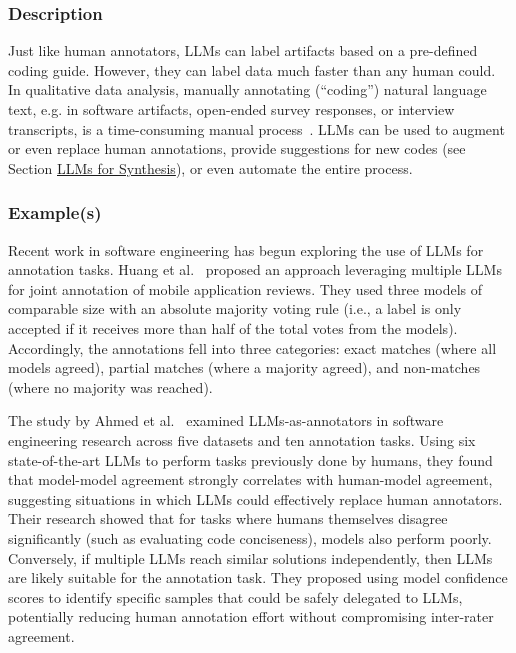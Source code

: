 \subsubsection{Description}

Just like human annotators, LLMs can label artifacts based on a pre-defined coding guide.
However, they can label data much faster than any human could. 
In qualitative data analysis, manually annotating (``coding'') natural language text, e.g. in software artifacts, open-ended survey responses, or interview transcripts, is a time-consuming manual process~\cite{DBLP:journals/ase/BanoHZT24}.
LLMs can be used to augment or even replace human annotations, provide suggestions for new codes (see Section \href{/study-types/#llms-for-synthesis}{LLMs for Synthesis}), or even automate the entire process.

\subsubsection{Example(s)}

Recent work in software engineering has begun exploring the use of LLMs for annotation tasks.
Huang et al.~\cite{Huang2023Enhancing} proposed an approach leveraging multiple LLMs for joint annotation of mobile application reviews. 
They used three models of comparable size with an absolute majority voting rule (i.e., a label is only accepted if it receives more than half of the total votes from the models). %
Accordingly, the annotations fell into three categories: exact matches (where all models agreed), partial matches (where a majority agreed), and non-matches (where no majority was reached).

The study by Ahmed et al.~\cite{Ahmed2025} examined LLMs-as-annotators in software engineering research across five datasets and ten annotation tasks. Using six state-of-the-art LLMs to perform tasks previously done by humans, they found that model-model agreement strongly correlates with human-model agreement, suggesting situations in which LLMs could effectively replace human annotators. Their research showed that for tasks where humans themselves disagree significantly (such as evaluating code conciseness), models also perform poorly. Conversely, if multiple LLMs reach similar solutions independently, then LLMs are likely suitable for the annotation task. They proposed using model confidence scores to identify specific samples that could be safely delegated to LLMs, potentially reducing human annotation effort without compromising inter-rater agreement.

